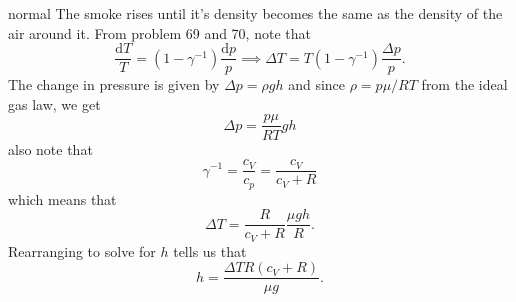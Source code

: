 \begin{solution}{normal}
The smoke rises until it's density becomes the same as the density of the air around it. From problem 69 and 70, note that 
\[\frac{\text{d}T}{T} = (1 - \gamma^{-1}) \frac{\text{d}p}{p}\implies \Delta T = T (1 - \gamma^{-1}) \frac{\Delta p}{p}.\]
The change in pressure is given by $\Delta p = \rho gh$ and since $\rho = p\mu/RT$ from the ideal gas law, we get 
\[\Delta p = \frac{p \mu}{RT} gh\]
also note that 
\[\gamma^{-1} = \frac{c_V}{c_p} = \frac{c_V}{c_V + R}\]
which means that 
\[\Delta T = \frac{R}{c_V + R}\frac{\mu gh}{R}.\]
Rearranging to solve for $h$ tells us that 
\[h = \frac{\Delta T R (c_V + R)}{\mu g}.\]
\end{solution}
